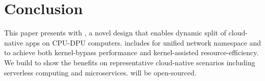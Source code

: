 \section{Conclusion}
\label{s:conclusion}

This paper presents \xpod with \os, a novel design that enables dynamic split of cloud-native apps on CPU-DPU computers.
\os includes \giptable for unified network namespace and \gsocket to achieve both kernel-bypass performance and kernel-assisted resource-efficiency.
We build \sys to show the benefits on representative cloud-native scenarios including serverless computing and microservices.
\os will be open-sourced.


